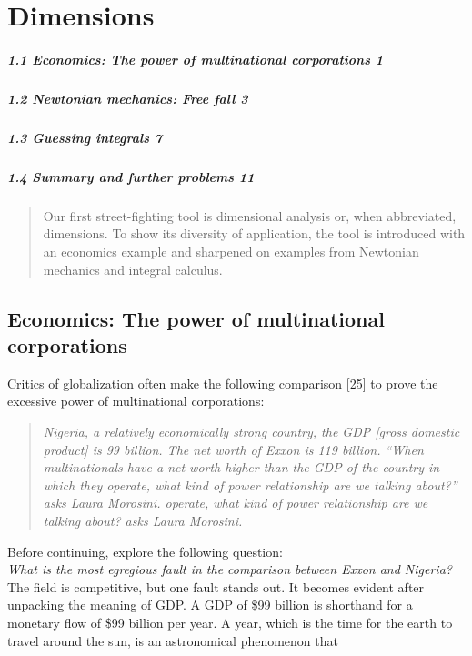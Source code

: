 \documentclass[12pt]{article}
\begin{document}
 
\section{{\bf Dimensions}}

\begin{quote}
\end{quote}

\subparagraph{1.1 Economics: The power of multinational corporations 1}
\subparagraph{1.2 Newtonian mechanics: Free fall 3}
\subparagraph{1.3 Guessing integrals 7}
\subparagraph{1.4 Summary and further problems 11}

\begin{quote}

Our first street-fighting tool is dimensional analysis or, when abbreviated,
dimensions. To show its diversity of application, the tool is introduced
with an economics example and sharpened on examples from Newtonian
mechanics and integral calculus.
\end{quote}
\begin{center}
{\bf \subsection{Economics: The power of multinational corporations}}
\end{center}
Critics of globalization often make the following comparison [25] to prove
the excessive power of multinational corporations:

\begin{quote}
\textit{Nigeria, a relatively economically strong country, the GDP [gross domestic
product] is 99 billion. The net worth of Exxon is 119 billion. “When multinationals
have a net worth higher than the GDP of the country in which they
operate, what kind of power relationship are we talking about?” asks Laura
Morosini.
operate, what kind of power relationship are we talking about?  asks Laura
Morosini.}
\end{quote} 
Before continuing, explore the following question:\\
 {\it What is the most egregious fault in the comparison between Exxon and Nigeria?} \\
The field is competitive, but one fault stands out. It becomes evident after
unpacking the meaning of GDP. A GDP of \$99 billion is shorthand for
a monetary flow of \$99 billion per year. A year, which is the time for
the earth to travel around the sun, is an astronomical phenomenon that
\newpage
\pagestyle{fancy} 
\fancyhf{}
\end{document}
